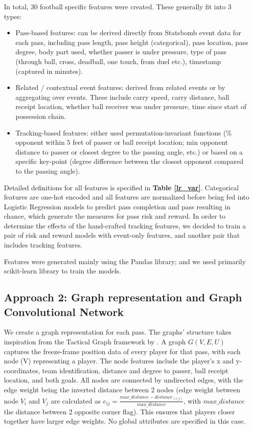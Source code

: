 \documentclass[conference]{IEEEtran}
\begin{document}
In total, 30 football specific features were created. These generally fit into 3 types:
\begin{itemize}
\item Pass-based features: can be derived directly from Statsbomb event data for each pass, including pass length, pass height (categorical), pass location, pass degree, body part used, whether passer is under pressure, type of pass (through ball, cross, deadball, one touch, from duel etc.), timestamp (captured in minutes).
\item Related / contextual event features: derived from related events or by aggregating over events. These include carry speed, carry distance, ball receipt location, whether ball receiver was under pressure, time since start of possession chain.
\item Tracking-based features: either used permutation-invariant functions (\% opponent within 5 feet of passer or ball receipt location; min opponent distance to passer or closest degree to the passing angle, etc.) or based on a specific key-point (degree difference between the closest opponent compared to the passing angle).

\end{itemize}

Detailed definitions for all features is specified in \textbf{Table \ref{lr_var}}. Categorical features are one-hot encoded and all features are normalized before being fed into Logistic Regression models to predict pass completion and pass resulting in chance, which generate the measures for pass risk and reward. In order to determine the effects of the hand-crafted tracking features, we decided to train a pair of risk and reward models with event-only features, and another pair that includes tracking features.

Features were generated mainly using the Pandas library; and we used primarily scikit-learn library to train the models. 

\subsection{Approach 2: Graph representation and Graph Convolutional Network}\label{appgnn}

We create a graph representation for each pass. The graphs' structure takes inspiration from the Tactical Graph framework by \textcite{gnn_framework}. A graph $G(V,E,U)$ captures the freeze-frame position data of every player for that pass, with each node (V) representing a player. The node features include the player's x and y-coordinates, team identification, distance and degree to passer, ball receipt location, and both goals. All nodes are connected by undirected edges, with the edge weight being the inverted distance between 2 nodes (edge weight between node $V_i$ and $V_j$ are calculated as $e_{ij}=\frac{max\_distance-distance_(i,j)}{max\_distance}$, with $max\_distance$ the distance between 2 opposite corner flag). This ensures that players closer together have larger edge weights. No global attributes are specified in this case. 
\end{document}
